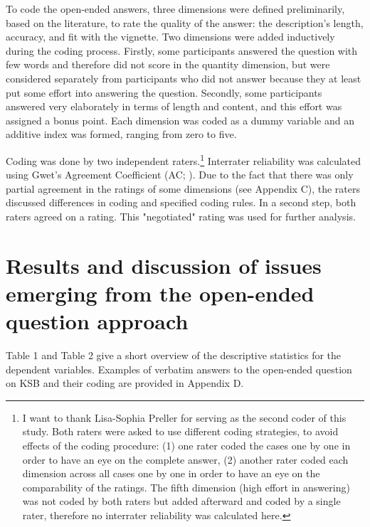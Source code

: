 \documentclass[twocolumn, issue, empirical, authordate]{jote-new-article}
\begin{document}
To code the open-ended answers, three dimensions were defined preliminarily, based on the literature, to rate the quality of the answer: the description's length, accuracy, and fit with the vignette.
Two dimensions were added inductively during the coding process.
Firstly, some participants answered the question with few words and therefore did not score in the quantity dimension, but were considered separately from participants who did not answer because they at least put some effort into answering the question. Secondly, some participants answered very elaborately in terms of length and content, and this effort was assigned a bonus point. Each dimension was coded as a dummy variable and an additive index was formed, ranging from zero to five.




Coding was done by two independent raters.\footnote{I want to thank Lisa-Sophia Preller for serving as the second coder of this study.
 Both raters were asked to use different coding strategies, to avoid effects of the coding procedure: (1) one rater coded the cases one by one in order to have an eye on the complete answer, (2) another rater coded each dimension across all cases one by one in order to have an eye on the comparability of the ratings. The fifth dimension (high effort in answering) was not coded by both raters but added afterward and coded by a single rater, therefore no interrater reliability was calculated here.} Interrater reliability was calculated using Gwet's Agreement Coefficient (AC; ). Due to the fact that there was only partial agreement in the ratings of some dimensions (see Appendix C), the raters discussed differences in coding and specified coding rules. In a second step, both raters agreed on a rating. This "negotiated" rating was used for further analysis.



\section{Results and discussion of issues emerging from the open-ended question approach}

Table 1 and Table 2 give a short overview of the descriptive statistics for the dependent variables. Examples of verbatim answers to the open-ended question on KSB and their coding are provided in Appendix D.
\end{document}
